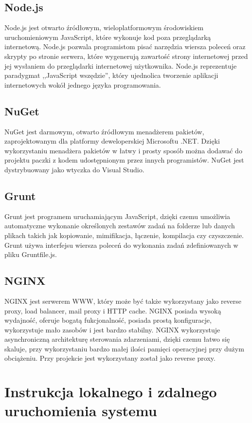 \documentclass[12pt,a4paper]{article}
\begin{document}
		\subsection{Node.js}
			\indent Node.js jest otwarto źródłowym, wieloplatformowym środowiskiem uruchomieniowym JavaScript, które wykonuje kod poza przeglądarką internetową. Node.js pozwala
			programistom pisać narzędzia wiersza poleceń oraz skrypty po stronie serwera, które wygenerują zawartość strony internetowej przed jej wysłaniem do przeglądarki
			internetowej użytkownika. Node.js reprezentuje paradygmat ,,JavaScript wszędzie'', który ujednolica tworzenie aplikacji internetowych wokół jednego języka programowania. 
		\subsection{NuGet}
			\indent NuGet jest darmowym, otwarto źródłowym menadżerem pakietów, zaprojektowanym dla platformy deweloperskiej Microsoftu .NET. Dzięki wykorzystaniu menadżera pakietów
			w łatwy i prosty sposób można dodawać do projektu paczki z kodem udostępnionym przez innych programistów. NuGet jest dystrybuowany jako wtyczka do Visual Studio.
		\subsection{Grunt}
			\indent Grunt jest programem uruchamiającym JavaScript, dzięki czemu umożliwia automatyczne wykonanie określonych zestawów zadań na folderze lub danych plikach takich jak
			kopiowanie,	mimifikacja, łączenie, kompilacja czy czyszczenie. Grunt używa interfejsu wiersza poleceń do wykonania zadań zdefiniowanych w pliku Gruntfile.js. 
		\subsection{NGINX}
			\indent NGINX jest serwerem WWW, który może być także wykorzystany jako reverse proxy, load balancer, mail proxy i HTTP cache. NGINX posiada wysoką wydajność, oferuje
			bogatą fukcjonalność, posiada prostą konfiguracje, wykorzystuje mało zasobów i jest bardzo stabilny. NGINX wykorzystuje asynchroniczną architekturę sterowania zdarzeniami,
			dzięki czemu łatwo się skaluje, przy wykorzystaniu bardzo małej ilości pamięci operacyjnej przy dużym obciążeniu. Przy projekcie jest wykorzystany został jako reverse proxy.
	\newpage
		
	\section{Instrukcja lokalnego i zdalnego uruchomienia systemu}
\end{document}
